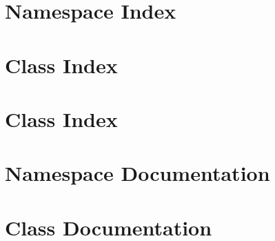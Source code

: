 \documentclass[a4paper]{book}
\begin{document}
\chapter{Namespace Index}

\chapter{Class Index}

\chapter{Class Index}

\chapter{Namespace Documentation}

\chapter{Class Documentation}




























































\end{document}
